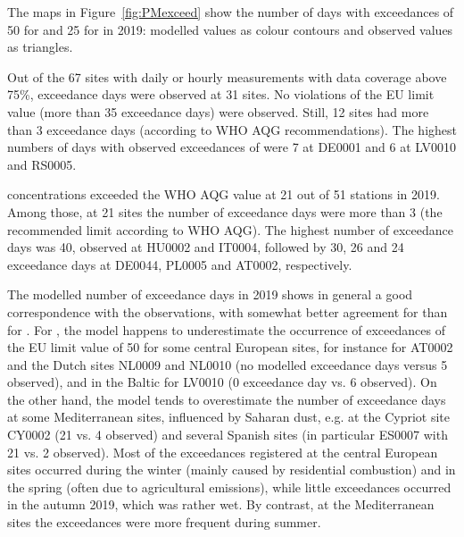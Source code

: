 The maps in Figure~\ref{fig:PMexceed} show the number of days with
exceedances of 50 \ug for \PM[10] and 25 \ug for \PM[2.5] in 2019:
modelled values as colour contours and observed values as triangles.

Out of the 67 sites with daily or hourly \PM[10] measurements with data
coverage above 75\%, exceedance days were observed at 31 sites. No
violations of the \PM[10] EU limit value (more than 35 exceedance
days) were observed. Still, 12 sites had more than 3 exceedance days
(according to WHO AQG recommendations). The highest numbers of days
with observed exceedances of \PM[10] were 7 at DE0001 and 6 at LV0010 and RS0005.

\PM[2.5] concentrations exceeded the WHO AQG value at 21 out of 51
stations in 2019. Among those, at 21 sites the number of exceedance
days were more than 3 (the recommended limit according to WHO AQG). 
The highest number of exceedance days was 40, observed at HU0002 and IT0004, followed by 30, 26 and 24 exceedance days at DE0044, PL0005 and AT0002, respectively.

The modelled number of exceedance days in 2019 shows in general a good correspondence with the observations, with somewhat better agreement for \PM[10] than for \PM[2.5]. For \PM[10], the model happens to underestimate the occurrence of exceedances of the EU limit value of 50 \ug for some central European sites, for instance for AT0002 and the Dutch sites NL0009 and NL0010 (no modelled exceedance days versus 5 observed), and in the Baltic for LV0010 (0 exceedance day vs. 6 observed). On the other hand, the model tends to overestimate the number of exceedance days at some Mediterranean sites, influenced by Saharan dust, e.g. at the Cypriot site CY0002 (21 vs. 4 observed) and several Spanish sites (in particular ES0007 with 21 vs. 2 observed). Most of the exceedances registered at the central European sites occurred during the winter (mainly caused by residential combustion) and in the spring (often due to agricultural emissions), while little exceedances occurred in the autumn 2019, which was rather wet. By contrast, at the Mediterranean sites the exceedances were more frequent during summer.

